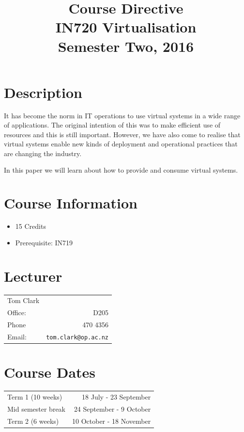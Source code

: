 \documentclass{article}
\begin{document}
\title{Course Directive\\IN720 Virtualisation\\Semester Two, 2016}
\date{}
\maketitle

\section*{Description}
It has become the norm in IT operations to use virtual systems in a wide range of applications.  The original intention of this was to make efficient use of resources and this is still important.  However, we have also come to realise that virtual systems enable new kinds of deployment and operational practices that are changing the industry.

In this paper we will learn about how to provide and consume virtual systems.

\section*{Course Information}
\begin{itemize}
  \item 15 Credits
  \item Prerequisite: IN719
\end{itemize}

\section*{Lecturer}
\begin{tabular}{lr}

  Tom Clark &    \\
     Office: & D205 \\
     Phone & 470 4356 \\
     Email: & \texttt{tom.clark@op.ac.nz} \\
\end{tabular}

\section*{Course Dates}
\begin{tabular}{lr}
Term 1 (10 weeks) & 18 July - 23 September \\
Mid semester break & 24 September - 9 October \\
Term 2 (6 weeks) & 10 October - 18 November \\
\end{tabular}
\end{document}
